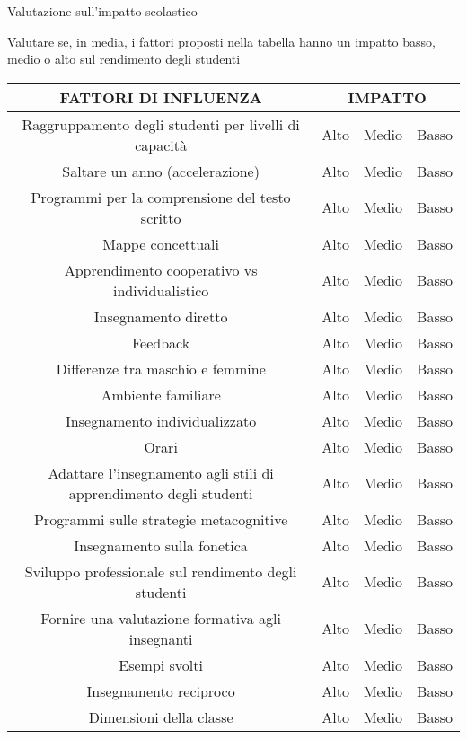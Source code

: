 \documentclass[a4paper]{article}
\begin{document}
	\begin{center}
		\huge{Valutazione sull'impatto scolastico}
	\end{center}
	
	\vspace{10mm}
	
	Valutare se, in media, i fattori proposti nella tabella hanno un impatto basso, medio o alto sul rendimento degli studenti
	
	\begin{center}
		\begin{tabular}[h!]{|c|c|c|c|}
			\toprule
			FATTORI DI INFLUENZA & \multicolumn{3}{c|}{IMPATTO}\\
			\midrule
			Raggruppamento degli studenti per livelli di capacità & Alto & Medio & Basso \\
			Saltare un anno (accelerazione) & Alto & Medio & Basso\\
			Programmi per la comprensione del testo scritto & Alto & Medio & Basso\\
			Mappe concettuali & Alto & Medio & Basso\\
			Apprendimento cooperativo vs individualistico & Alto & Medio & Basso\\
			Insegnamento diretto & Alto & Medio & Basso\\
			Feedback & Alto & Medio & Basso\\
			Differenze tra maschio e femmine & Alto & Medio & Basso\\
			Ambiente familiare & Alto & Medio & Basso\\
			Insegnamento individualizzato & Alto & Medio & Basso\\
			Orari & Alto & Medio & Basso\\
			Adattare l'insegnamento agli stili di apprendimento degli studenti & Alto & Medio & Basso\\
			Programmi sulle strategie metacognitive & Alto & Medio & Basso\\
			Insegnamento sulla fonetica & Alto & Medio & Basso\\
			Sviluppo professionale sul rendimento degli studenti & Alto & Medio & Basso\\
			Fornire una valutazione formativa agli insegnanti & Alto & Medio & Basso\\
			Esempi svolti & Alto & Medio & Basso\\
			Insegnamento reciproco & Alto & Medio & Basso\\
			Dimensioni della classe & Alto & Medio & Basso\\

\end{tabular}
\end{center}
\end{document}
